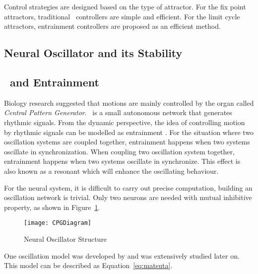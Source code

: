 Control strategies are designed based on the type of attractor.
For the fix point attractors, traditional \pd\ controllers are simple and efficient.
For the limit cycle attractors,  entrainment controllers are  proposed as an efficient method.


\subsection{Neural Oscillator and its Stability}


\subsection{\cpg\ and Entrainment}
Biology research suggested that motions are mainly controlled by the organ called \emph{Central Pattern Generator}.
\cpg\ is a small autonomous network that generates rhythmic signals.
From the dynamic perspective, the idea of controlling motion by rhythmic signals can be modelled as entrainment \citep{Gonz'alez-Miranda2004}.
For the situation where two oscillation systems are coupled together, entrainment happens when two systems oscillate in synchronization.
When coupling two oscillation system together, entrainment happens when two systems oscillate in synchronize. 
This effect is also known as a resonant which will enhance the oscillating behaviour. 


For the neural system, it is difficult to carry out precise computation, building an oscillation network is trivial. 
Only two neurons are needed with mutual inhibitive property, as shown in Figure~\ref{fig:cpgdia}.
\begin{figure}[h]
\begin{center}
\texttt{[image: CPGDiagram]}
\caption{Neural Oscillator Structure}
\label{fig:cpgdia}
\end{center}
\end{figure}


One oscillation model was developed  by \citet{neurooscillation} and was extensively studied later on. 
This model can be described as Equation~\ref{eq:matsuta}.

